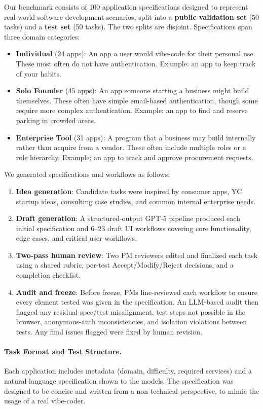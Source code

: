 Our benchmark consists of 100 application specifications designed to represent real-world software development scenarios, split into a \textbf{public validation set} (50 tasks) and a \textbf{test set} (50 tasks). The two splits are disjoint. Specifications span three domain categories:
\begin{itemize}
    \item \textbf{Individual} (24 apps): An app a user would vibe-code for their personal use. These most often do not have authentication. Example: an app to keep track of your habits.
    \item \textbf{Solo Founder} (45 apps): An app someone starting a business might build themselves. These often have simple email-based authentication, though some require more complex authentication. Example: an app to find and reserve parking in crowded areas.
    \item \textbf{Enterprise Tool} (31 apps): A program that a business may build internally rather than acquire from a vendor. These often include multiple roles or a role hierarchy. Example: an app to track and approve procurement requests.
\end{itemize}

We generated specifications and workflows as follows:
\begin{enumerate}
    \item \textbf{Idea generation}: Candidate tasks were inspired by consumer apps, YC startup ideas, consulting case studies, and common internal enterprise needs.
    \item \textbf{Draft generation}: A structured-output GPT-5 pipeline produced each initial specification and 6--23 draft UI workflows covering core functionality, edge cases, and critical user workflows.
    \item \textbf{Two-pass human review}: Two PM reviewers edited and finalized each task using a shared rubric, per-test Accept/Modify/Reject decisions, and a completion checklist.
    \item \textbf{Audit and freeze}: Before freeze, PMs line-reviewed each workflow to ensure every element tested was given in the specification. An LLM-based audit then flagged any residual spec/test misalignment, test steps not possible in the browser, anonymous-auth inconsistencies, and isolation violations between tests. Any final issues flagged were fixed by human revision.
\end{enumerate}


\paragraph{Task Format and Test Structure.}
Each application includes metadata (domain, difficulty, required services) and a natural-language specification shown to the models. The specification was designed to be concise and written from a non-technical perspective, to mimic the usage of a real vibe-coder.

